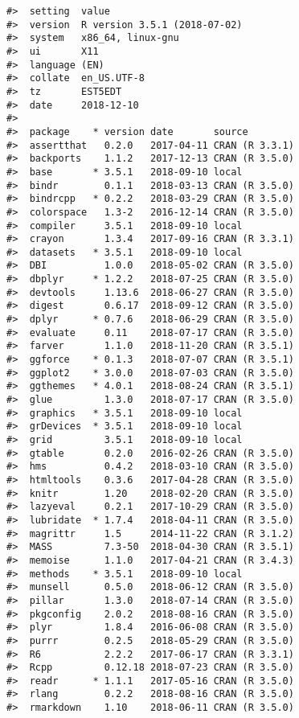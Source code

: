 \documentclass[]{article}
\begin{document}
\begin{verbatim}
#>  setting  value                       
#>  version  R version 3.5.1 (2018-07-02)
#>  system   x86_64, linux-gnu           
#>  ui       X11                         
#>  language (EN)                        
#>  collate  en_US.UTF-8                 
#>  tz       EST5EDT                     
#>  date     2018-12-10                  
#> 
#>  package    * version date       source        
#>  assertthat   0.2.0   2017-04-11 CRAN (R 3.3.1)
#>  backports    1.1.2   2017-12-13 CRAN (R 3.5.0)
#>  base       * 3.5.1   2018-09-10 local         
#>  bindr        0.1.1   2018-03-13 CRAN (R 3.5.0)
#>  bindrcpp   * 0.2.2   2018-03-29 CRAN (R 3.5.0)
#>  colorspace   1.3-2   2016-12-14 CRAN (R 3.5.0)
#>  compiler     3.5.1   2018-09-10 local         
#>  crayon       1.3.4   2017-09-16 CRAN (R 3.3.1)
#>  datasets   * 3.5.1   2018-09-10 local         
#>  DBI          1.0.0   2018-05-02 CRAN (R 3.5.0)
#>  dbplyr     * 1.2.2   2018-07-25 CRAN (R 3.5.0)
#>  devtools     1.13.6  2018-06-27 CRAN (R 3.5.0)
#>  digest       0.6.17  2018-09-12 CRAN (R 3.5.0)
#>  dplyr      * 0.7.6   2018-06-29 CRAN (R 3.5.0)
#>  evaluate     0.11    2018-07-17 CRAN (R 3.5.0)
#>  farver       1.1.0   2018-11-20 CRAN (R 3.5.1)
#>  ggforce    * 0.1.3   2018-07-07 CRAN (R 3.5.1)
#>  ggplot2    * 3.0.0   2018-07-03 CRAN (R 3.5.0)
#>  ggthemes   * 4.0.1   2018-08-24 CRAN (R 3.5.1)
#>  glue         1.3.0   2018-07-17 CRAN (R 3.5.0)
#>  graphics   * 3.5.1   2018-09-10 local         
#>  grDevices  * 3.5.1   2018-09-10 local         
#>  grid         3.5.1   2018-09-10 local         
#>  gtable       0.2.0   2016-02-26 CRAN (R 3.5.0)
#>  hms          0.4.2   2018-03-10 CRAN (R 3.5.0)
#>  htmltools    0.3.6   2017-04-28 CRAN (R 3.5.0)
#>  knitr        1.20    2018-02-20 CRAN (R 3.5.0)
#>  lazyeval     0.2.1   2017-10-29 CRAN (R 3.5.0)
#>  lubridate  * 1.7.4   2018-04-11 CRAN (R 3.5.0)
#>  magrittr     1.5     2014-11-22 CRAN (R 3.1.2)
#>  MASS         7.3-50  2018-04-30 CRAN (R 3.5.1)
#>  memoise      1.1.0   2017-04-21 CRAN (R 3.4.3)
#>  methods    * 3.5.1   2018-09-10 local         
#>  munsell      0.5.0   2018-06-12 CRAN (R 3.5.0)
#>  pillar       1.3.0   2018-07-14 CRAN (R 3.5.0)
#>  pkgconfig    2.0.2   2018-08-16 CRAN (R 3.5.0)
#>  plyr         1.8.4   2016-06-08 CRAN (R 3.5.0)
#>  purrr        0.2.5   2018-05-29 CRAN (R 3.5.0)
#>  R6           2.2.2   2017-06-17 CRAN (R 3.3.1)
#>  Rcpp         0.12.18 2018-07-23 CRAN (R 3.5.0)
#>  readr      * 1.1.1   2017-05-16 CRAN (R 3.5.0)
#>  rlang        0.2.2   2018-08-16 CRAN (R 3.5.0)
#>  rmarkdown    1.10    2018-06-11 CRAN (R 3.5.0)

\end{verbatim}
\end{document}
